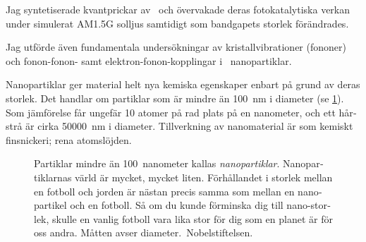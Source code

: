 \documentclass[draft,webedition,openright,titles,swedish,english]{LuaUUThesis}\usepackage[]{graphicx}\usepackage[]{xcolor}
\begin{document}
\begin{otherlanguage}{swedish}
Jag syntetiserade kvantprickar av \ZnO\ och övervakade deras fotokatalytiska
verkan under simulerat AM1.5G solljus samtidigt som bandgapets storlek förändrades.

Jag utförde även fundamentala undersökningar av kristallvibrationer (fononer) och
fonon-fonon- samt elektron-fonon-kopplingar i \ZnO\ nanopartiklar.

Nanopartiklar ger material helt nya kemiska egenskaper enbart på grund av deras storlek.
Det handlar om partiklar som är mindre än \qty{100}{\nm} i diameter
(se \cref{fig:0900-nanopartikel-storlek}).
Som jämförelse får ungefär 10 atomer på rad plats på en nanometer, och ett hårstrå
är cirka \qty{50000}{\nm} i diameter.
Tillverkning av nanomaterial är som kemiskt finsnickeri; rena atomslöjden.

%

\begin{figure}[tbp]
\centering
\caption[Nanopartiklars storlek]{%
   Partiklar mindre än \qty{100}{nanometer} kallas \emph{nanopartiklar}.
   Nanopartiklarnas värld är mycket, mycket liten.
   Förhållandet i storlek mellan en fotboll och jorden är nästan precis samma
   som mellan en nanopartikel och en fotboll.
   Så om du kunde förminska dig till nano-storlek, skulle en vanlig fotboll
   vara lika stor för dig som en planet är för oss andra. Måtten avser diameter.
   {\footnotesize\CCBYND[\tiny]\,Nobelstiftelsen.}
}
\label{fig:0900-nanopartikel-storlek}
\end{figure}




\end{otherlanguage}
\end{document}
